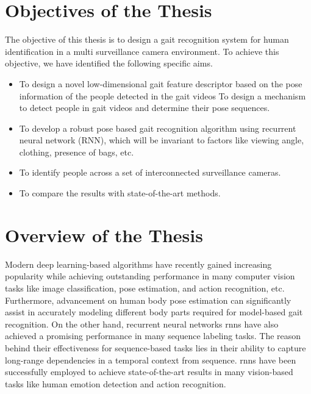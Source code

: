 \section{Objectives of the Thesis}
The objective of this thesis is to design a gait recognition system for human identification in a multi surveillance camera environment. To achieve this objective, we have identified the following specific aims.
\begin{itemize}
\item To design a novel low-dimensional gait feature descriptor based on the pose information of the people detected in the gait videos To design a mechanism to detect people in gait videos and determine their pose sequences. 
\item To develop a robust pose based gait recognition algorithm using recurrent neural network (RNN), which will be invariant to factors like viewing angle, clothing, presence of bags, etc.
\item To identify people across a set of interconnected surveillance cameras.
\item To compare the results with state-of-the-art methods.
\end{itemize}



\section{Overview of the Thesis}
Modern deep learning-based algorithms have recently gained increasing popularity while achieving outstanding performance in many computer vision tasks like image classification, pose estimation, and action recognition, etc. Furthermore, advancement on human body pose estimation can significantly assist in accurately modeling different body parts required for model-based gait recognition. On the other hand, recurrent neural networks \gls{rnn}s have also achieved a promising performance in many sequence labeling tasks. The reason behind their effectiveness for sequence-based tasks lies in their ability to capture long-range dependencies in a temporal context from sequence. \gls{rnn}s have been successfully employed to achieve state-of-the-art results in many vision-based tasks like human emotion detection and action recognition.

